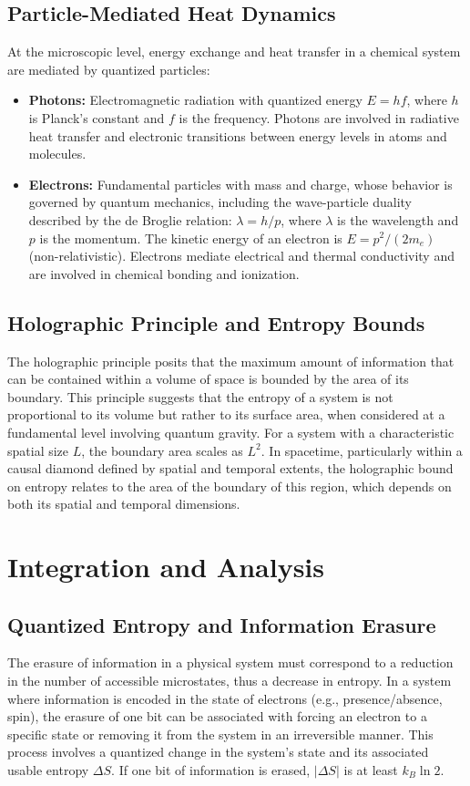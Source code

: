 \documentclass{article}
\begin{document}
		\subsection{Particle-Mediated Heat Dynamics}
		At the microscopic level, energy exchange and heat transfer in a chemical system are mediated by quantized particles:
		\begin{itemize}
			\item \textbf{Photons:} Electromagnetic radiation with quantized energy $E = h f$, where $h$ is Planck's constant and $f$ is the frequency. Photons are involved in radiative heat transfer and electronic transitions between energy levels in atoms and molecules.
			\item \textbf{Electrons:} Fundamental particles with mass and charge, whose behavior is governed by quantum mechanics, including the wave-particle duality described by the de Broglie relation: $\lambda = h/p$, where $\lambda$ is the wavelength and $p$ is the momentum. The kinetic energy of an electron is $E = p^2 / (2m_e)$ (non-relativistic). Electrons mediate electrical and thermal conductivity and are involved in chemical bonding and ionization.
		\end{itemize}
		
		\subsection{Holographic Principle and Entropy Bounds}
		The holographic principle posits that the maximum amount of information that can be contained within a volume of space is bounded by the area of its boundary. This principle suggests that the entropy of a system is not proportional to its volume but rather to its surface area, when considered at a fundamental level involving quantum gravity. For a system with a characteristic spatial size $L$, the boundary area scales as $L^2$. In spacetime, particularly within a causal diamond defined by spatial and temporal extents, the holographic bound on entropy relates to the area of the boundary of this region, which depends on both its spatial and temporal dimensions.
		
		\section{Integration and Analysis}
		
		\subsection{Quantized Entropy and Information Erasure}
		The erasure of information in a physical system must correspond to a reduction in the number of accessible microstates, thus a decrease in entropy. In a system where information is encoded in the state of electrons (e.g., presence/absence, spin), the erasure of one bit can be associated with forcing an electron to a specific state or removing it from the system in an irreversible manner. This process involves a quantized change in the system's state and its associated usable entropy $\Delta S$. If one bit of information is erased, $|\Delta S|$ is at least $k_B \ln 2$.
		
\end{document}

